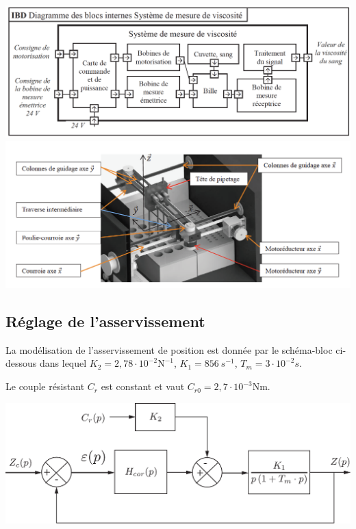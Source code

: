 \documentclass[10pt,fleqn]{article} %
\begin{document}
\begin{multicols}{2}
	\begin{center}
			\includegraphics[width=1.0\linewidth]{images/chronometrie_IBD}\\
			\includegraphics[width=1.0\linewidth]{images/schema_axez}
    \end{center}


\subsection*{Réglage de l'asservissement}


La modélisation de l'asservissement de position est donnée par le schéma-bloc ci-dessous dans lequel $K_2 = 2,78 \cdot 10^{-2} \text{N}^{-1}$, $K_1 = \SI{856}{s^{-1}}$, $T_m= 3\cdot  10^{-2} s$.

Le couple résistant $C_r$ est constant et vaut $C_{r0} = 2,7 \cdot 10^{-3} \text{Nm}$.



\begin{center}
\includegraphics[width=0.9\linewidth]{images/schema_bloc.pdf}
\end{center}


\end{multicols}
\end{document}
